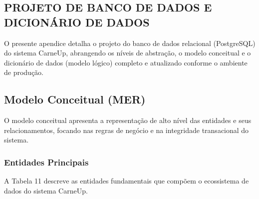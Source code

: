 \documentclass[
	12pt,				%
	openany,			%
	oneside,			%
	a4paper,			%
	english,			%
	french,				%
	spanish,			%
	brazil				%
	]{abntex2}
\begin{document}
\begin{apendicesenv}

\chapter{PROJETO DE BANCO DE DADOS E DICIONÁRIO DE DADOS}
\label{apendice:banco_dados}

O presente apendice detalha o projeto do banco de dados relacional (PostgreSQL) do sistema CarneUp, abrangendo os níveis de abstração, o modelo conceitual e o dicionário de dados (modelo lógico) completo e atualizado conforme o ambiente de produção.

\section{Modelo Conceitual (MER)}

O modelo conceitual apresenta a representação de alto nível das entidades e seus relacionamentos, focando nas regras de negócio e na integridade transacional do sistema.

\subsection{Entidades Principais}

A Tabela 11 descreve as entidades fundamentais que compõem o ecossistema de dados do sistema CarneUp.


\end{apendicesenv}
\end{document}
